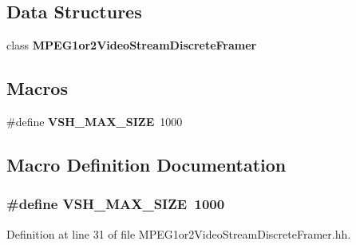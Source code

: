 \subsection*{Data Structures}
\begin{DoxyCompactItemize}
\item 
class {\bf M\+P\+E\+G1or2\+Video\+Stream\+Discrete\+Framer}
\end{DoxyCompactItemize}
\subsection*{Macros}
\begin{DoxyCompactItemize}
\item 
\#define {\bf V\+S\+H\+\_\+\+M\+A\+X\+\_\+\+S\+I\+Z\+E}~1000
\end{DoxyCompactItemize}


\subsection{Macro Definition Documentation}
\subsubsection[{V\+S\+H\+\_\+\+M\+A\+X\+\_\+\+S\+I\+Z\+E}]{\setlength{\rightskip}{0pt plus 5cm}\#define V\+S\+H\+\_\+\+M\+A\+X\+\_\+\+S\+I\+Z\+E~1000}\label{MPEG1or2VideoStreamDiscreteFramer_8hh_ab3821ddbc642a26e32eae2eea93d3f01}


Definition at line 31 of file M\+P\+E\+G1or2\+Video\+Stream\+Discrete\+Framer.\+hh.

